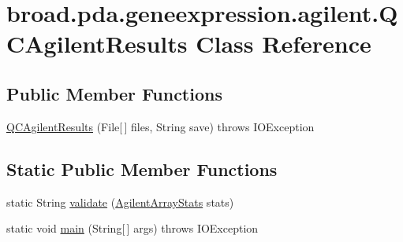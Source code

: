 \hypertarget{classbroad_1_1pda_1_1geneexpression_1_1agilent_1_1_q_c_agilent_results}{\section{broad.\+pda.\+geneexpression.\+agilent.\+Q\+C\+Agilent\+Results Class Reference}
\label{classbroad_1_1pda_1_1geneexpression_1_1agilent_1_1_q_c_agilent_results}
}
\subsection*{Public Member Functions}
\begin{DoxyCompactItemize}
\item 
\hyperlink{classbroad_1_1pda_1_1geneexpression_1_1agilent_1_1_q_c_agilent_results_a50f24612582b0505aa3a50cabc18e48f}{Q\+C\+Agilent\+Results} (File\mbox{[}$\,$\mbox{]} files, String save)  throws I\+O\+Exception
\end{DoxyCompactItemize}
\subsection*{Static Public Member Functions}
\begin{DoxyCompactItemize}
\item 
static String \hyperlink{classbroad_1_1pda_1_1geneexpression_1_1agilent_1_1_q_c_agilent_results_ac6e05cc8be9d2794d88d91252246874c}{validate} (\hyperlink{classbroad_1_1pda_1_1geneexpression_1_1agilent_1_1_agilent_array_stats}{Agilent\+Array\+Stats} stats)
\item 
static void \hyperlink{classbroad_1_1pda_1_1geneexpression_1_1agilent_1_1_q_c_agilent_results_a79a517846de25b324dd6dec0e2ba8831}{main} (String\mbox{[}$\,$\mbox{]} args)  throws I\+O\+Exception
\end{DoxyCompactItemize}


